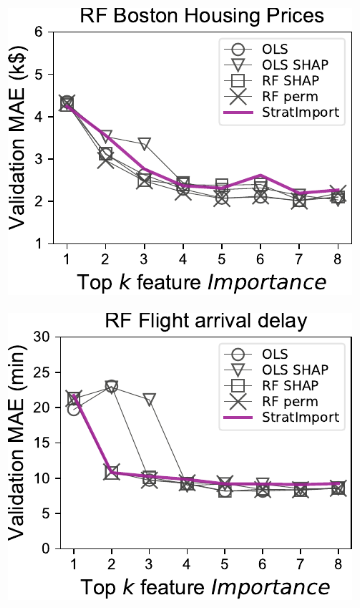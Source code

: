 \documentclass[11pt]{article}
\begin{document}
\begin{figure}
\centering
\begin{subfigure}{.245\textwidth}
    \centering
\includegraphics[scale=0.45]{images/boston-topk-RF-Importance.pdf}
\end{subfigure}%
\hfill
\begin{subfigure}{.245\textwidth}
    \centering
\includegraphics[scale=0.45]{images/flights-topk-RF-Importance.pdf}
\end{subfigure}
\hfill
\begin{subfigure}{.245\textwidth}
    \centering

\end{subfigure}
\end{figure}
\end{document}
